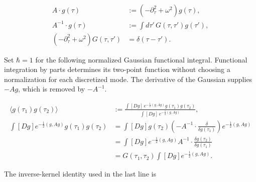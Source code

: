 \begin{align}
  A\cdot g(\tau)
  &:=(-\partial_\tau^2+\omega^2)g(\tau),
  \label{eq:proposal-functional-A}\\
  A^{-1}\cdot g(\tau)
  &:=\int d\tau'\,G(\tau,\tau')g(\tau'),
  \label{eq:proposal-functional-A-inverse}\\
  (-\partial_\tau^2+\omega^2)G(\tau,\tau')
  &=\delta(\tau-\tau').
  \label{eq:proposal-green-equation}
\end{align}

Set $\hbar=1$ for the following normalized Gaussian functional integral.
Functional integration by parts determines its two-point function without
choosing a normalization for each discretized mode.  The derivative of the
Gaussian supplies $-Ag$, which is removed by $-A^{-1}$.

\begin{align}
  \langle g(\tau_1)g(\tau_2)\rangle
  &:=\frac{
    \displaystyle\int[Dg]\,
    e^{-\frac12(g,Ag)}g(\tau_1)g(\tau_2)}
  {\displaystyle\int[Dg]\,e^{-\frac12(g,Ag)}},
  \label{eq:proposal-functional-expectation}\\
  \int[Dg]e^{-\frac12(g,Ag)}g(\tau_1)g(\tau_2)
  &=\int[Dg]g(\tau_2)
  \left(-A^{-1}\cdot\frac{\delta}{\delta g(\tau_1)}\right)
  e^{-\frac12(g,Ag)}
  \nonumber\\
  &=\int[Dg]e^{-\frac12(g,Ag)}
  A^{-1}\cdot\frac{\delta g(\tau_2)}{\delta g(\tau_1)}
  \nonumber\\
  &=G(\tau_1,\tau_2)
  \int[Dg]e^{-\frac12(g,Ag)}.
  \label{eq:proposal-functional-integration-by-parts}
\end{align}

The inverse-kernel identity used in the last line is

